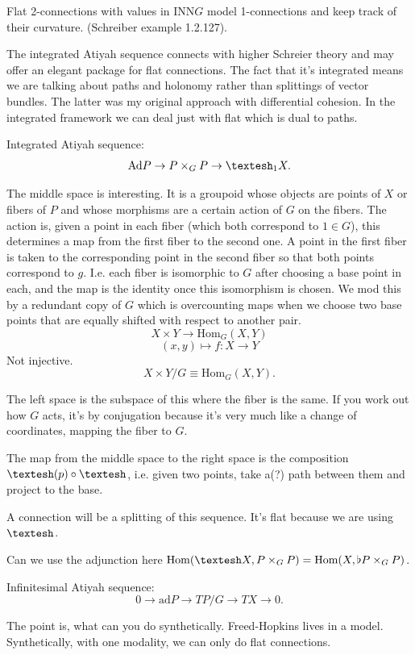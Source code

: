 \documentclass[12pt]{article}
\newcommand{\Hom}{\mathrm{Hom}}
\newcommand{\shape}{\ensuremath{\text{\textesh}}}
\begin{document}
Flat 2-connections with values in $\mathrm{INN}G$ model 1-connections and keep track of their curvature. (Schreiber example 1.2.127).

The integrated Atiyah sequence connects with higher Schreier theory and may offer an elegant package for flat connections. The fact that it's integrated means we are talking about paths and holonomy rather than splittings of vector bundles. The latter was my original approach with differential cohesion. In the integrated framework we can deal just with flat which is dual to paths.

Integrated Atiyah sequence: \[ \mathrm{Ad}P \to P\times_GP \to \shape_1X.\]

The middle space is interesting. It is a groupoid whose objects are points of $X$ or fibers of $P$ and whose morphisms are a certain action of $G$ on the fibers. The action is, given a point in each fiber (which both correspond to $1\in G$), this determines a map from the first fiber to the second one. A point in the first fiber is taken to the corresponding point in the second fiber so that both points correspond to $g$. I.e. each fiber is isomorphic to $G$ after choosing a base point in each, and the map is the identity once this isomorphism is chosen. We mod this by a redundant copy of $G$ which is overcounting maps when we choose two base points that are equally shifted with respect to another pair. \[X\times Y \to \Hom_G(X, Y)\] \[(x, y) \mapsto f: X \to Y\] Not injective. \[ X\times Y / G \equiv \Hom_G(X, Y).\]

The left space is the subspace of this where the fiber is the same. If you work out how $G$ acts, it's by conjugation because it's very much like a change of coordinates, mapping the fiber to $G$.

The map from the middle space to the right space is the composition $\shape(p)\circ\shape$, i.e. given two points, take a(?) path between them and project to the base.

 A connection will be a splitting of this sequence. It's flat because we are using $\shape$.

Can we use the adjunction here $\Hom(\shape X, P\times_GP) = \Hom(X, \flat P\times_GP)$.

Infinitesimal Atiyah sequence: \[ 0 \to \mathrm{ad}P \to TP/G \to TX \to 0.\]

The point is, what can you do synthetically. Freed-Hopkins lives in a model. Synthetically, with one modality, we can only do flat connections.
\end{document}
